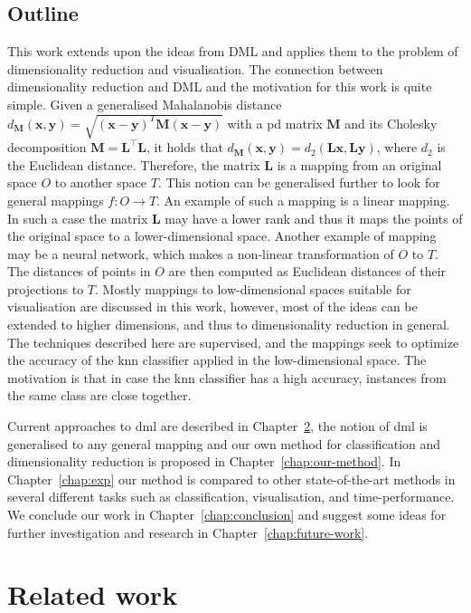 \documentclass[12pt,a4paper]{report}
\begin{document}
\section{Outline}
This work extends upon the ideas from DML and applies them to the problem of dimensionality reduction and visualisation. The connection between dimensionality reduction and DML and the motivation for this work is quite simple. Given a generalised Mahalanobis distance $d_{\bm{M}}(\textbf{x},\textbf{y}) = \sqrt{(\textbf{x}-\textbf{y})^{T}\bm{M}(\textbf{x}-\textbf{y})}$ with a \ac{pd} matrix $\bm{M}$ and its Cholesky decomposition $\bm{M}=\bm{L}^\top\bm{L}$, it holds that $d_{\bm{M}}(\textbf{x},\textbf{y}) = d_{2}(\bm{L}\textbf{x},\bm{L}\textbf{y})$, where $d_2$ is the Euclidean distance. Therefore, the matrix $\bm{L}$ is a mapping from an original space $O$ to another space $T$. This notion can be generalised further to look for general mappings $f: O \to T$. An example of such a mapping is a linear mapping. In such a case the matrix $\bm{L}$ may have a lower rank and thus it maps the points of the original space to a lower-dimensional space. Another example of mapping may be a neural network, which makes a non-linear transformation of $O$ to $T$. The distances of points in $O$ are then computed as Euclidean distances of their projections to $T$. Mostly mappings to low-dimensional spaces suitable for visualisation are discussed in this work, however, most of the ideas can be extended to higher dimensions, and thus to dimensionality reduction in general. The techniques described here are supervised, and the mappings seek to optimize the accuracy of the \ac{knn} classifier applied in the low-dimensional space. The motivation is that in case the \ac{knn} classifier has a high accuracy, instances from the same class are close together.

Current approaches to \ac{dml} are described in Chapter~\ref{chap:rw}, the notion of \ac{dml} is generalised to any general mapping and our own method for classification and dimensionality reduction is proposed in Chapter~\ref{chap:our-method}. In Chapter~\ref{chap:exp} our method is compared to other state-of-the-art methods in several different tasks such as classification, visualisation, and time-performance. We conclude our work in Chapter~\ref{chap:conclusion} and suggest some ideas for further investigation and research in Chapter~\ref{chap:future-work}.


\chapter{Related work} \label{chap:rw}
\end{document}
